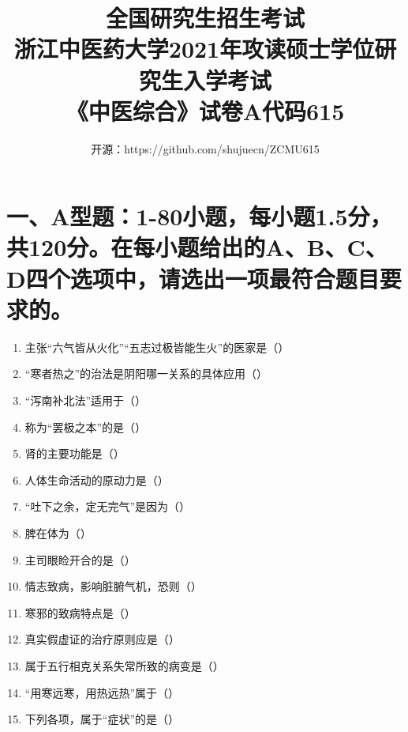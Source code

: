 \documentclass[a4paper,11pt]{ctexart}
\title{全国研究生招生考试 \\ 浙江中医药大学2021年攻读硕士学位研究生入学考试 \\ 《中医综合》试卷A代码615}
\author{开源：https://github.com/shujuecn/ZCMU615}
\date{}
\begin{document}
\maketitle

\section*{\large 一、A型题：1-80小题，每小题1.5分，共120分。在每小题给出的A、B、C、D四个选项中，请选出一项最符合题目要求的。}

\begin{enumerate}
      \item 主张“六气皆从火化”“五志过极皆能生火”的医家是（\quad）
      \item “寒者热之”的治法是阴阳哪一关系的具体应用（\quad）
      \item “泻南补北法”适用于（\quad）
      \item 称为“罢极之本”的是（\quad）
      \item 肾的主要功能是（\quad）
      \item 人体生命活动的原动力是（\quad）
      \item “吐下之余，定无完气”是因为（\quad）
      \item 脾在体为（\quad）
      \item 主司眼睑开合的是（\quad）
      \item 情志致病，影响脏腑气机，恐则（\quad）
      \item 寒邪的致病特点是（\quad）
      \item 真实假虚证的治疗原则应是（\quad）
      \item 属于五行相克关系失常所致的病变是（\quad）
      \item “用寒远寒，用热远热”属于（\quad）
      \item 下列各项，属于“症状”的是（\quad）

\end{enumerate}
\end{document}
